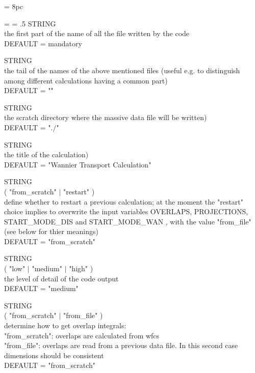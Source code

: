 \newdimen\descindent \descindent = 8pc
{\noindent \leftskip = \descindent \parskip = .5\baselineskip
{}%
STRING \\ the first part of the name of all the file written by
the code\\ DEFAULT = mandatory \par

\noindent{}%
STRING \\ the tail of the names of the above mentioned files (useful e.g. to
distinguish among different calculations having a common part)\\ DEFAULT = "" \par

\noindent{}%
STRING \\ the scratch directory where the massive data file will be written)\\ DEFAULT = "$./$" \par

\noindent{}%
STRING \\ the title of the calculation)\\ DEFAULT = "Wannier Transport Calculation" \par

\noindent{}%
STRING \\ ( "from\_scratch" $\mid$ "restart" ) \\define whether to restart a previous calculation;
at the moment the "restart" choice implies to overwrite the input variables OVERLAPS, PROJECTIONS,
START\_MODE\_DIS and START\_MODE\_WAN , with the value "from\_file" (see below
for thier meanings)\\ DEFAULT = "from\_scratch" \par

\noindent{}%
STRING \\ ( "low" $\mid$ "medium" $\mid$ "high" )
\\the level of detail of the code output\\ DEFAULT = "medium" \par

\noindent{}%
STRING \\ ( "from\_scratch" $\mid$ "from\_file" )\\
determine how to get overlap integrals:\\
"from\_scratch":  overlaps are calculated from wfcs\\
"from\_file":     overlaps are read from a previous data file.
In this second case dimensions should be consistent\\ DEFAULT = "from\_scratch" \par

}
